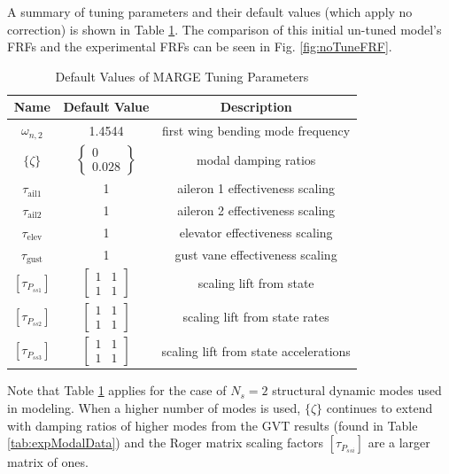 A summary of tuning parameters and their default values (which apply no correction) is shown in Table \ref{tab:tuningParams}. The comparison of this initial un-tuned model's FRFs and the experimental FRFs can be seen in Fig. \ref{fig:noTuneFRF}.
\begin{table}[h]
	\centering
	\label{tab:tuningParams}
	\caption{Default Values of MARGE Tuning Parameters}
	\begin{tabular}{ccc}
		\hline\hline
		Name & Default Value & Description \\
		\hline
		$\omega_{n,2}$ & 1.4544 & first wing bending mode frequency \\
		$\{\zeta\}$ & $\begin{Bmatrix} 0 \\ 0.028 \end{Bmatrix}$ & modal damping ratios \\
		$\tau_\text{ail1}$ & 1 & aileron 1 effectiveness scaling \\
		$\tau_\text{ail2}$ & 1 & aileron 2 effectiveness scaling \\
		$\tau_\text{elev}$ & 1 & elevator effectiveness scaling \\
		$\tau_\text{gust}$ & 1 & gust vane effectiveness scaling \\
		$\left[\tau_{P_{ss1}}\right]$ & $\begin{bmatrix} 1 & 1 \\ 1 & 1 \end{bmatrix}$ & scaling lift from state \\
		$\left[\tau_{P_{ss2}}\right]$ & $\begin{bmatrix} 1 & 1 \\ 1 & 1 \end{bmatrix}$ & scaling lift from state rates \\
		$\left[\tau_{P_{ss3}}\right]$ & $\begin{bmatrix} 1 & 1 \\ 1 & 1 \end{bmatrix}$ & scaling lift from state accelerations \\
		\hline\hline
	\end{tabular}
\end{table}
Note that Table \ref{tab:tuningParams} applies for the case of $N_s=2$ structural dynamic modes used in modeling. When a higher number of modes is used, $\{\zeta\}$ continues to extend with damping ratios of higher modes from the GVT results (found in Table \ref{tab:expModalData}) and the Roger matrix scaling factors $[\tau_{P_{ssi}}]$ are a larger matrix of ones.

